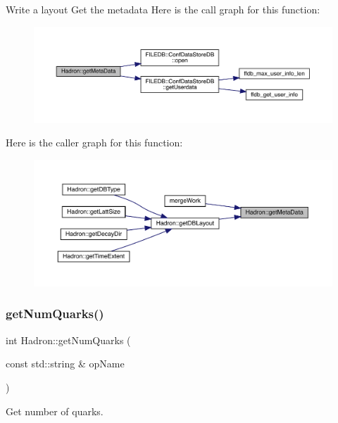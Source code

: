 Write a layout Get the metadata Here is the call graph for this function\+:\nopagebreak
\begin{figure}[H]
\begin{center}
\leavevmode
\includegraphics[width=350pt]{d1/daf/namespaceHadron_a6c9f3d44d269357faf4d786cc73ec742_cgraph}
\end{center}
\end{figure}
Here is the caller graph for this function\+:\nopagebreak
\begin{figure}[H]
\begin{center}
\leavevmode
\includegraphics[width=350pt]{d1/daf/namespaceHadron_a6c9f3d44d269357faf4d786cc73ec742_icgraph}
\end{center}
\end{figure}
\mbox{\label{namespaceHadron_a030f1f2fabdb2b0de5421b2a0a15689c}} 
\subsubsection{\texorpdfstring{getNumQuarks()}{getNumQuarks()}}
{\footnotesize\ttfamily int Hadron\+::get\+Num\+Quarks (\begin{DoxyParamCaption}\item[{const std\+::string \&}]{op\+Name }\end{DoxyParamCaption})}



Get number of quarks. 

